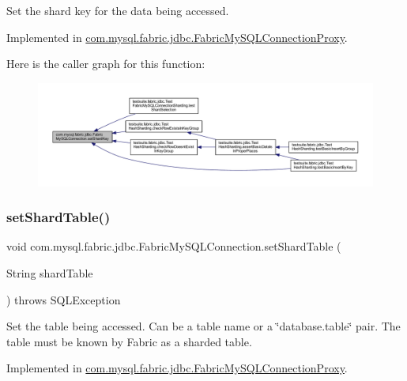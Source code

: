 Set the shard key for the data being accessed. 

Implemented in \mbox{\hyperlink{classcom_1_1mysql_1_1fabric_1_1jdbc_1_1_fabric_my_s_q_l_connection_proxy_ace89320543442af9fbe6034a4171333b}{com.\+mysql.\+fabric.\+jdbc.\+Fabric\+My\+S\+Q\+L\+Connection\+Proxy}}.

Here is the caller graph for this function\+:\nopagebreak
\begin{figure}[H]
\begin{center}
\leavevmode
\includegraphics[width=350pt]{interfacecom_1_1mysql_1_1fabric_1_1jdbc_1_1_fabric_my_s_q_l_connection_ab3be2f1efeb29e95c43ef316dd8ce0bf_icgraph}
\end{center}
\end{figure}
\mbox{\label{interfacecom_1_1mysql_1_1fabric_1_1jdbc_1_1_fabric_my_s_q_l_connection_a5e9287d2536bd36fcc2f63d8a27a6b9b}} 
\subsubsection{\texorpdfstring{set\+Shard\+Table()}{setShardTable()}}
{\footnotesize\ttfamily void com.\+mysql.\+fabric.\+jdbc.\+Fabric\+My\+S\+Q\+L\+Connection.\+set\+Shard\+Table (\begin{DoxyParamCaption}\item[{String}]{shard\+Table }\end{DoxyParamCaption}) throws S\+Q\+L\+Exception}

Set the table being accessed. Can be a table name or a \char`\"{}database.\+table\char`\"{} pair. The table must be known by Fabric as a sharded table. 

Implemented in \mbox{\hyperlink{classcom_1_1mysql_1_1fabric_1_1jdbc_1_1_fabric_my_s_q_l_connection_proxy_a3dd3f50c8de7678f002bae64114643c3}{com.\+mysql.\+fabric.\+jdbc.\+Fabric\+My\+S\+Q\+L\+Connection\+Proxy}}.

